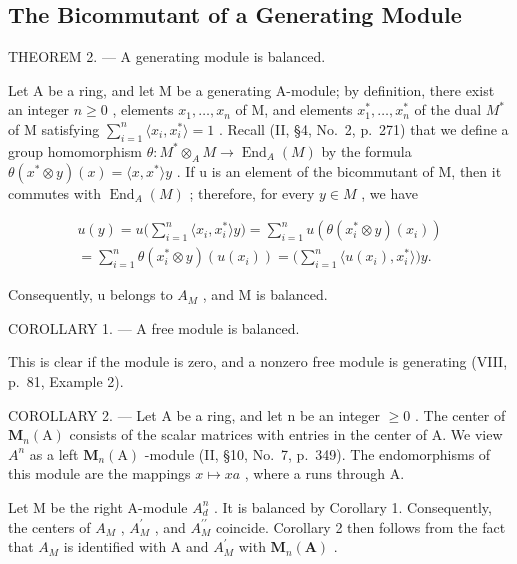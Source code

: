 \subsection{The Bicommutant of a Generating Module}

THEOREM 2. --- A generating module is balanced.

Let A be a ring, and let M be a generating A-module; by definition, there exist an integer \(n \geqslant 0\) , elements \(x_{1}, \ldots, x_{n}\) of M, and elements \(x_{1}^{*}, \ldots, x_{n}^{*}\) of the dual \(M^{*}\) of M satisfying \(\sum_{i=1}^{n} \langle x_{i}, x_{i}^{*} \rangle = 1\) . Recall (II, §4, No.~2, p.~271) that we define a group homomorphism \(\theta : M^{*} \otimes_{A} M \to \operatorname{End}_{A}(M)\) by the formula \(\theta(x^{*} \otimes y)(x) = \langle x, x^{*} \rangle y\) . If u is an element of the bicommutant of M, then it commutes with \(\operatorname{End}_{A}(M)\) ; therefore, for every \(y \in M\) , we have

\[
\begin{array}{l} u (y) = u \Big (\sum_ {i = 1} ^ {n} \langle x _ {i}, x _ {i} ^ {*} \rangle y \Big) = \sum_ {i = 1} ^ {n} u (\theta (x _ {i} ^ {*} \otimes y) (x _ {i})) \\ = \sum_ {i = 1} ^ {n} \theta (x _ {i} ^ {*} \otimes y) (u (x _ {i})) = \Big (\sum_ {i = 1} ^ {n} \langle u (x _ {i}), x _ {i} ^ {*} \rangle \Big) y. \end{array}
\]

Consequently, u belongs to \(A_{M}\) , and M is balanced.

COROLLARY 1. --- A free module is balanced.

This is clear if the module is zero, and a nonzero free module is generating (VIII, p.~81, Example 2).

COROLLARY 2. --- Let A be a ring, and let n be an integer \(\geqslant 0\) . The center of \(\mathbf{M}_{n}(\mathrm{A})\) consists of the scalar matrices with entries in the center of A. We view \(A^{n}\) as a left \(\mathbf{M}_{n}(\mathrm{A})\) -module (II, §10, No.~7, p.~349). The endomorphisms of this module are the mappings \(x \mapsto xa\) , where a runs through A.

Let M be the right A-module \(A_{d}^{n}\) . It is balanced by Corollary 1. Consequently, the centers of \(A_{M}\) , \(A_{M}^{\prime}\) , and \(A_{M}^{\prime\prime}\) coincide. Corollary 2 then follows from the fact that \(A_{M}\) is identified with A and \(A_{M}^{\prime}\) with \(\mathbf{M}_{n}(\mathbf{A})\) .

